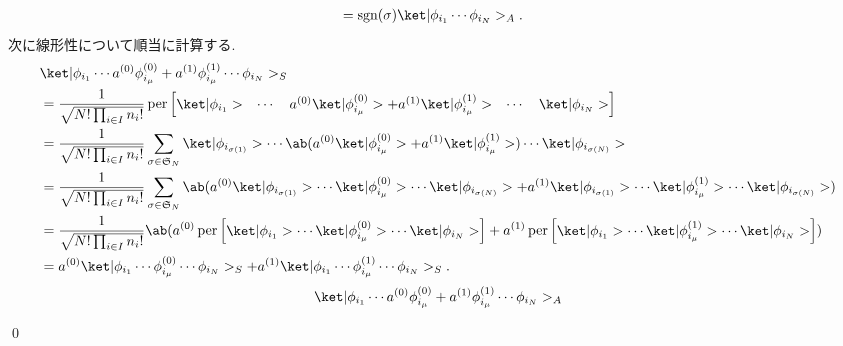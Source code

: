 \documentclass[uplatex,dvipdfmx,a4paper,11pt]{jlreq}
\makeatletter
\DeclareMathOperator{\sgn}{sgn}
\DeclareMathOperator{\per}{per}
\renewcommand{\SS}{\mathfrak{S}}
\numberwithin{equation}{section}
\theoremstyle{definition}
\renewenvironment{proof}[1][\proofname]{\par
  \normalfont
  \topsep6\p@\@plus6\p@ \trivlist
  \item[\hskip\labelsep{\bfseries #1}\@addpunct{\bfseries}]\ignorespaces\quad\par
}{
  \qed\endtrivlist\@endpefalse
}
\renewcommand\proofname{証明}
\makeatother
\begin{document}
\begin{proof}
\begin{align}
                                                           & = \sgn(\sigma)\ket|\phi_{i_1}\cdots\phi_{i_N}>_A.
  \end{align}
  次に線形性について順当に計算する.
  \begin{align}
     & \ket|\phi_{i_1}\cdots a^{(0)}\phi_{i_\mu}^{(0)} + a^{(1)}\phi_{i_\mu}^{(1)}\cdots\phi_{i_N}>_S                                                                                                                                                                        \\
     & = \frac{1}{\sqrt{N!\prod_{i\in I}n_i!}}\per\begin{bmatrix}\ket|\phi_{i_1}> & \cdots & a^{(0)}\ket|\phi_{i_\mu}^{(0)}> + a^{(1)}\ket|\phi_{i_\mu}^{(1)}> & \cdots & \ket|\phi_{i_N}>\end{bmatrix}                                                                      \\
     & = \frac{1}{\sqrt{N!\prod_{i\in I}n_i!}}\sum_{\sigma\in\SS_N}\ket|\phi_{i_{\sigma(1)}}>\cdots\ab(a^{(0)}\ket|\phi_{i_\mu}^{(0)}> + a^{(1)}\ket|\phi_{i_\mu}^{(1)}>)\cdots\ket|\phi_{i_{\sigma(N)}}>                                                                    \\
     & = \frac{1}{\sqrt{N!\prod_{i\in I}n_i!}}\sum_{\sigma\in\SS_N}\ab(a^{(0)}\ket|\phi_{i_{\sigma(1)}}>\cdots\ket|\phi_{i_\mu}^{(0)}>\cdots\ket|\phi_{i_{\sigma(N)}}> + a^{(1)}\ket|\phi_{i_{\sigma(1)}}>\cdots\ket|\phi_{i_\mu}^{(1)}>\cdots\ket|\phi_{i_{\sigma(N)}}>)    \\
     & = \frac{1}{\sqrt{N!\prod_{i\in I}n_i!}}\ab(a^{(0)}\per\begin{bmatrix}\ket|\phi_{i_1}>\cdots\ket|\phi_{i_\mu}^{(0)}>\cdots\ket|\phi_{i_N}>\end{bmatrix} + a^{(1)}\per\begin{bmatrix}\ket|\phi_{i_1}>\cdots\ket|\phi_{i_\mu}^{(1)}>\cdots\ket|\phi_{i_N}>\end{bmatrix}) \\
     & = a^{(0)}\ket|\phi_{i_1}\cdots\phi_{i_\mu}^{(0)}\cdots\phi_{i_N}>_S + a^{(1)}\ket|\phi_{i_1}\cdots\phi_{i_\mu}^{(1)}\cdots\phi_{i_N}>_S.
  \end{align}
  \begin{align}
     & \ket|\phi_{i_1}\cdots a^{(0)}\phi_{i_\mu}^{(0)} + a^{(1)}\phi_{i_\mu}^{(1)}\cdots\phi_{i_N}>_A                                                                                                                                                               \\

\end{align}
\end{proof}
\end{document}
